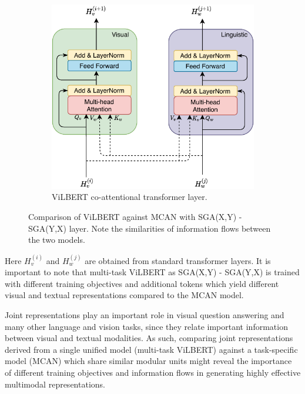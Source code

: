 \documentclass{article}
\begin{document}
\begin{figure}[ht]
\begin{subfigure}[b]{\textwidth}
	\includegraphics[scale=0.7]{vilbert_coattention}
	\caption{ViLBERT co-attentional transformer layer.}
	\end{subfigure}
\caption{Comparison of ViLBERT against MCAN with SGA(X,Y) - SGA(Y,X) layer. Note the similarities of information flows between the two models.}
\label{fig:vilbert_coattention}
\end{figure}

Here $H_{v}^{(i)}$ and $H_{w}^{(j)}$ are obtained from standard transformer layers. It is important to note that  multi-task ViLBERT as SGA(X,Y) - SGA(Y,X) is trained with different training objectives and additional tokens which yield different visual and textual representations compared to the MCAN model. 

Joint representations play an important role in visual question answering and many other language and vision tasks, since they relate important information between visual and textual modalities. As such, comparing joint representations derived from a single unified model (multi-task ViLBERT) against a task-specific model (MCAN) which share similar modular units might reveal the importance of different training objectives and information flows in generating highly effective multimodal representations.

\end{document}
